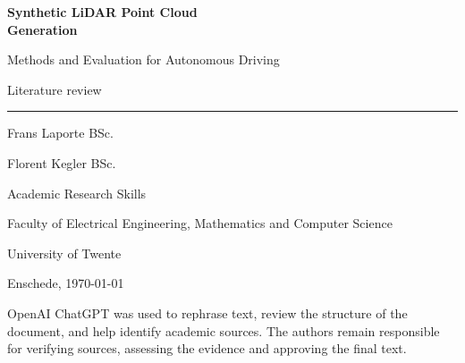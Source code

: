 \begin{titlepage}
\thispagestyle{empty}
\vspace{6mm}
{\fontsize{30}{34}\selectfont\bfseries Synthetic LiDAR Point Cloud \\Generation\par}
\vspace{4mm}
{\fontsize{18}{23}\selectfont Methods and Evaluation for Autonomous Driving\par}
\vspace{3mm}
{\color{muted}Literature review\par}
\vspace{4mm}
{\color{rulegray}\hrule}
\vspace{4mm}

\begin{minipage}[t]{.48\linewidth}
\vspace{3mm}
Frans Laporte BSc.\par
\LaporteEmailLink\par
\vspace{3mm}
Florent Kegler BSc.\par
\KeglerEmailLink
\end{minipage}\hfill
\begin{minipage}[t]{.48\linewidth}
\vspace{3mm}
\TopicContactLink\par
\TopicContactEmailLink\par
\vspace{3mm}
\vspace{3mm}
\EEROBContactLink\par
\EEROBContactEmailLink
\end{minipage}

\vspace{6mm}
\vspace{3mm}
Academic Research Skills\par
Faculty of Electrical Engineering, Mathematics and Computer Science\par
University of Twente

\vspace{4mm}
\vspace{3mm}
Enschede, \today

\vspace{4mm}
\vspace{2mm}
{\small\color{muted}OpenAI ChatGPT was used to rephrase text, review the structure of the document, and help identify academic sources.
The authors remain responsible for verifying sources, assessing the evidence
and approving the final text.\par}


\end{titlepage}
